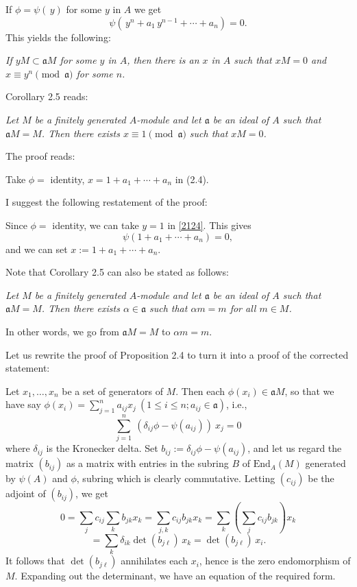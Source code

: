 \documentclass[parskip=half,fontsize=12pt]{scrartcl}%
\newcommand{\mf}{\mathfrak}
\begin{document}
If $\phi=\psi(\,y)$ for some $y$ in $A$ we get 
\begin{equation}\label{2124}
\psi(\,y^n+a_1\,y^{n-1}+\cdots+a_n)=0.
\end{equation}
This yields the following:

\emph{If $yM\subset\mf aM$ for some $y$ in $A$, then there is an $x$ in $A$ such that $xM=0$ and $x\equiv y^n\pmod{\mf a}$ for some $n$.}

Corollary 2.5 reads:

\emph{Let $M$ be a finitely generated $A$-module and let $\mf a$ be an ideal of $A$ such that $\mf aM=M$. Then there exists $x\equiv1\pmod{\mf a}$ such that $xM=0$.}

The proof reads:

Take $\phi=$ identity, $x=1+a_1+\cdots+a_n$ in (2.4).

I suggest the following restatement of the proof:

Since $\phi=$ identity, we can take $y=1$ in \eqref{2124}. This gives 
$$
\psi(1+a_1+\cdots+a_n)=0,
$$ 
and we can set $x:=1+a_1+\cdots+a_n$.

Note that Corollary 2.5 can also be stated as follows:

\emph{Let $M$ be a finitely generated $A$-module and let $\mf a$ be an ideal of $A$ such that $\mf aM=M$. Then there exists $\alpha\in\mf a$ such that $\alpha m=m$ for all $m\in M$.}

In other words, we go from $\mf aM=M$ to $\alpha m=m$.

Let us rewrite the proof of Proposition 2.4 to turn it into a proof of the corrected statement:%

Let $x_1,\dots,x_n$ be a set of generators of $M$. Then each $\phi(x_i)\in\mf aM$, so that we have say $\phi(x_i)=\sum_{j=1}^na_{ij}x_j\ (1\le i\le n; a_{ij}\in\mf a)$, i.e., 
$$
\sum_{j=1}^n\ (\delta_{ij}\phi-\psi(a_{ij}))\ x_j=0
$$ 
where $\delta_{ij}$ is the Kronecker delta. Set $b_{ij}:=\delta_{ij}\phi-\psi(a_{ij})$, and let us regard the matrix $(b_{ij})$ as a matrix with entries in the subring $B$ of $\text{End}_A(M)$ generated by $\psi(A)$ and $\phi$, subring which is clearly commutative. Letting $(c_{ij})$ be the adjoint of $(b_{ij})$, we get 
$$
0=\sum_jc_{ij}\sum_kb_{jk}x_k=\sum_{j,k}c_{ij}b_{jk}x_k=\sum_k\left(\sum_jc_{ij}b_{jk}\right)x_k
$$ 
$$
=\sum_k\delta_{ik}\det(b_{j\ell})\,x_k=\det(b_{j\ell})\,x_i.
$$ %
It follows that $\det(b_{j\ell})$ annihilates each $x_i$, hence is the zero endomorphism of $M$. Expanding out the determinant, we have an equation of the required form.
\end{document}
